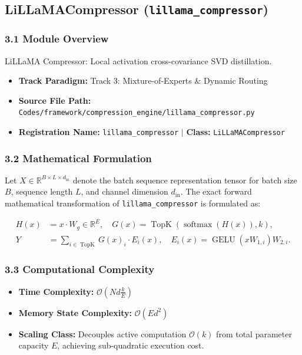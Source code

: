 \subsection{LiLLaMACompressor (\texttt{lillama\_compressor})}
\label{sec:app_module_lillama_compressor}

\subsubsection*{3.1 Module Overview}
LiLLaMA Compressor: Local activation cross-covariance SVD distillation.
\begin{itemize}
    \item \textbf{Track Paradigm:} Track 3: Mixture-of-Experts & Dynamic Routing
    \item \textbf{Source File Path:} \texttt{Codes/framework/compression\_engine/lillama\_compressor.py}
    \item \textbf{Registration Name:} \texttt{lillama\_compressor} $\mid$ \textbf{Class:} \texttt{LiLLaMACompressor}
\end{itemize}

\subsubsection*{3.2 Mathematical Formulation}
Let $X \in \mathbb{R}^{B \times L \times d_{\text{in}}}$ denote the batch sequence representation tensor for batch size $B$, sequence length $L$, and channel dimension $d_{\text{in}}$. The exact forward mathematical transformation of \texttt{lillama\_compressor} is formulated as:

\begin{align}
H(x) &= x \cdot W_g \in \mathbb{R}^{E}, \quad G(x) = \operatorname{TopK}\left(\operatorname{softmax}(H(x)), k\right), \\
Y &= \sum_{i \in \operatorname{TopK}} G(x)_i \cdot E_i(x), \quad E_i(x) = \operatorname{GELU}(x W_{1, i}) W_{2, i}.
\end{align}


\subsubsection*{3.3 Computational Complexity}
\begin{itemize}
    \item \textbf{Time Complexity:} $\mathcal{O}(N d \frac{k}{E})$
    \item \textbf{Memory State Complexity:} $\mathcal{O}(E d^2)$
    \item \textbf{Scaling Class:} Decouples active computation $\mathcal{O}(k)$ from total parameter capacity $E$, achieving sub-quadratic execution cost.
\end{itemize}

